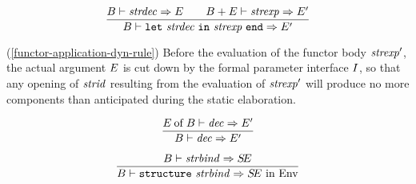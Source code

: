 
\begin{equation}        %
\frac{\B\ts\strdec\ra\E\qquad\B+\E\ts\strexp\ra\E'}
     {\B\ts\letstrexp\ra\E'}
\end{equation}
\comments
\begin{description}
\item{(\ref{functor-application-dyn-rule})}
Before the evaluation of the functor body ${\it strexp}'$, the
actual argument $E$ is cut down by the formal parameter
interface $I$, so that any opening of ${\it strid}$ resulting
from the evaluation of ${\it strexp}'$ will produce no more components
than anticipated during the static elaboration.
\end{description}

\begin{equation}                %
\frac{ \of{\E}{\B}\ts\dec\ra\E' }
     { \B\ts\dec\ra\E' }\index{60.2}
\end{equation}

\vspace{6pt}
\begin{equation}                %
\frac{ \B\ts\strbind\ra\SE }
     { \B\ts\singstrdec\ra\SE\ \In\ \Env }
\end{equation}

